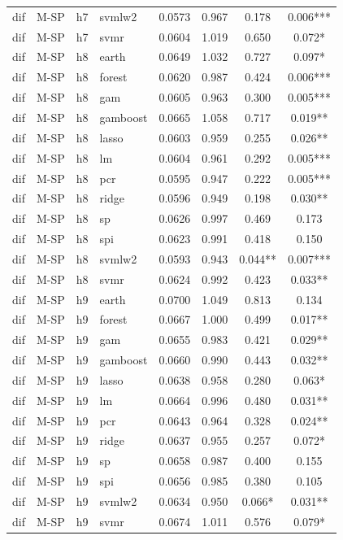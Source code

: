 \begin{ThreePartTable}
\begin{longtable}[t]{llclcccc}
dif & M-SP & h7 & svmlw2 & 0.0573 & 0.967 & 0.178 & 0.006***\\
dif & M-SP & h7 & svmr & 0.0604 & 1.019 & 0.650 & 0.072*\\
\addlinespace
dif & M-SP & h8 & earth & 0.0649 & 1.032 & 0.727 & 0.097*\\
dif & M-SP & h8 & forest & 0.0620 & 0.987 & 0.424 & 0.006***\\
dif & M-SP & h8 & gam & 0.0605 & 0.963 & 0.300 & 0.005***\\
dif & M-SP & h8 & gamboost & 0.0665 & 1.058 & 0.717 & 0.019**\\
dif & M-SP & h8 & lasso & 0.0603 & 0.959 & 0.255 & 0.026**\\
dif & M-SP & h8 & lm & 0.0604 & 0.961 & 0.292 & 0.005***\\
dif & M-SP & h8 & pcr & 0.0595 & 0.947 & 0.222 & 0.005***\\
dif & M-SP & h8 & ridge & 0.0596 & 0.949 & 0.198 & 0.030**\\
dif & M-SP & h8 & sp & 0.0626 & 0.997 & 0.469 & 0.173\\
dif & M-SP & h8 & spi & 0.0623 & 0.991 & 0.418 & 0.150\\
dif & M-SP & h8 & svmlw2 & 0.0593 & 0.943 & 0.044** & 0.007***\\
dif & M-SP & h8 & svmr & 0.0624 & 0.992 & 0.423 & 0.033**\\
\addlinespace
dif & M-SP & h9 & earth & 0.0700 & 1.049 & 0.813 & 0.134\\
dif & M-SP & h9 & forest & 0.0667 & 1.000 & 0.499 & 0.017**\\
dif & M-SP & h9 & gam & 0.0655 & 0.983 & 0.421 & 0.029**\\
dif & M-SP & h9 & gamboost & 0.0660 & 0.990 & 0.443 & 0.032**\\
dif & M-SP & h9 & lasso & 0.0638 & 0.958 & 0.280 & 0.063*\\
dif & M-SP & h9 & lm & 0.0664 & 0.996 & 0.480 & 0.031**\\
dif & M-SP & h9 & pcr & 0.0643 & 0.964 & 0.328 & 0.024**\\
dif & M-SP & h9 & ridge & 0.0637 & 0.955 & 0.257 & 0.072*\\
dif & M-SP & h9 & sp & 0.0658 & 0.987 & 0.400 & 0.155\\
dif & M-SP & h9 & spi & 0.0656 & 0.985 & 0.380 & 0.105\\
dif & M-SP & h9 & svmlw2 & 0.0634 & 0.950 & 0.066* & 0.031**\\
dif & M-SP & h9 & svmr & 0.0674 & 1.011 & 0.576 & 0.079*\\

\end{longtable}
\end{ThreePartTable}
